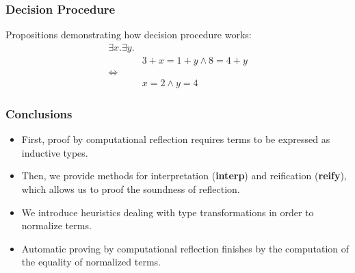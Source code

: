 \documentclass{beamer}
\begin{document}
\begin{frame}
  \frametitle{Decision Procedure}
  Propositions demonstrating how decision procedure works:
  \begin{align*}
    \exists x. \exists y. &
    \\
    & 3 + x = 1 + y \land 8 = 4 + y
    \\
    \iff &
    \\
    & x = 2 \land y = 4
  \end{align*}
\end{frame}

\begin{frame}
  \frametitle{Conclusions}
  \begin{itemize}\justifying
  \item First, proof by computational reflection requires terms to be expressed as inductive types.
  \item Then, we provide methods for interpretation (\textbf{interp}) and reification (\textbf{reify}), which allows us to proof the soundness of reflection.
  \item We introduce heuristics dealing with type transformations in order to normalize terms.
  \item Automatic proving by computational reflection finishes by the computation of the equality of normalized terms.
  \end{itemize}
\end{frame}
\end{document}
